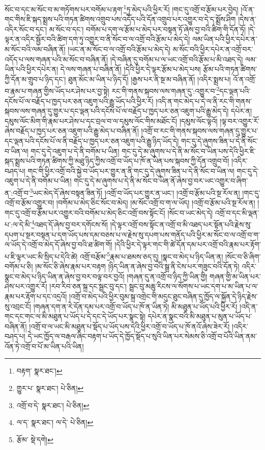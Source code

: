 སོང་བ་དང་མ་སོང་བ་མ་གཏོགས་པར་བགོམ་པ་རྟག་\footnote{བརྟག་  སྣར་ཐང་། }ཏུ་མེད་པའི་ཕྱིར་རོ། །གང་དུ་འགྲོ་བ་རྩོམ་པར་བྱེད། །འོ་ན་གང་གིས་ཇི་སྐད་སྨྲས་པའི་གཏན་ཚིགས་འགྲུབ་པས་འདོད་པའི་དོན་འགྲུབ་པར་འགྱུར་བ་དེ་ད་སྨྲོས་ཤིག །དེས་ན་འདིར་སོང་བ་དང་། མ་སོང་བ་དང་། བགོམ་པ་དག་ལ་རྩོམ་པ་མེད་པར་བསྟན་ཏོ་ཞེས་བྱ་བའི་ཚིག་གི་དོན་ཏོ། །དེ་ལྟར་ན་འདིར་སྦྱོར་བའི་ཚིག་དག་ཏུ་འགྱུར་བ་ནི་སོང་བ་ལ་འགྲོ་བའི་རྩོམ་པ་མེད་དེ། ལམ་ཡིན་པའི་ཕྱིར་དཔེར་ན་མ་སོང་བའི་ལམ་བཞིན་ནོ། །ཡང་ན་མ་སོང་བ་ལ་འགྲོ་བའི་རྩོམ་པ་མེད་དེ། མ་སོང་བའི་ཕྱིར་དཔེར་ན་འགྲོ་བར་འདོད་པ་ལས་གཞན་པའི་མ་སོང་བ་བཞིན་ནོ། །དེ་བཞིན་དུ་བགོམ་པ་ལ་ཡང་འགྲོ་བའི་རྩོམ་པ་མི་འཐད་དེ། ལམ་ཡིན་པའི་ཕྱིར་དཔེར་ན། དེ་ལས་གཞན་པ་བཞིན་ནོ། །དེའི་ཕྱིར་དེ་ལྟར་རྩོམ་པ་མེད་པས། རྩོམ་པའི་གཏན་ཚིགས་ཀྱི་དོན་མ་གྲུབ་པ་ཉིད་དང་། ཐུན་མོང་མ་ཡིན་པ་ཉིད་དོ། །རྒྱས་པར་ནི་སྔ་མ་བཞིན་ནོ། །འདིར་སྨྲས་པ། འོ་ན་འགྲོ་བ་རྣམ་པ་གཞན་གྱིས་ཡོད་པར་ཤེས་པར་བྱ་སྟེ། རང་གི་གནས་སྐབས་ལས་གཞན་དུ་:འགྱུར་བ་\footnote{གྱུར་པ་  སྣར་ཐང་།  པེ་ཅིན། }དང་ལྡན་པའི་དངོས་པོ་ལ་བརྗོད་པ་ཁྱད་པར་ཅན་འཇུག་པའི་རྒྱུ་ཡོད་པའི་ཕྱིར་རོ། །འདི་ན་གང་མེད་པ་དེ་ལ་ནི་རང་གི་གནས་སྐབས་ལས་གཞན་དུ་གྱུར་པ་དང་ལྡན་པའི་དངོས་པོ་ལ་བརྗོད་པ་ཁྱད་པར་ཅན་འཇུག་པའི་རྒྱུ་མེད་དེ། དཔེར་ན། དམུས་ལོང་མིག་གི་རྣམ་པར་ཤེས་པ་དང་བྲལ་བ་ལ་དམུས་ལོང་གིས་མཐོང་ངོ། །དམུས་ལོང་ལྟའོ། །ལྟ་བར་འགྱུར་རོ་ཞེས་བརྗོད་པ་ཁྱད་པར་ཅན་འཇུག་པའི་རྒྱུ་མེད་པ་བཞིན་ནོ། །འགྲོ་བ་རང་གི་གནས་སྐབས་ལས་གཞན་དུ་གྱུར་པ་དང་ལྡན་པའི་དངོས་པོ་ལ་ནི་བརྗོད་པ་ཁྱད་པར་ཅན་འཇུག་པའི་རྒྱུ་ཉིད་ཡོད་དེ། གང་དུ་དེ་ཞུགས་ཟིན་པ་དེ་ནི་སོང་བ་ཡིན་ལ། གང་དུ་དེ་འཇུག་པ་དེ་ནི་བགོམ་པ་ཡིན། གང་དུ་དེ་མ་ཞུགས་པ་དེ་ནི་མ་སོང་བ་ཡིན་པས་དེའི་ཕྱིར་ཇི་སྐད་སྨྲས་པའི་གཏན་ཚིགས་ཀྱི་མཐུ་ཉིད་ཀྱིས་འགྲོ་བ་ཡོད་པ་ཁོ་ན་ཡིན་པས་སྐབས་ཀྱི་དོན་འགྲུབ་བོ། །འདིར་བཤད་པ། གང་གི་ཕྱིར་འགྲོ་བའི་སྐྱེ་བ་ཡོད་པར་གྱུར་ན་ནི་གང་དུ་དེ་ཞུགས་ཟིན་པ་དེ་ནི་སོང་བ་ཡིན་ལ། གང་དུ་དེ་འཇུག་པ་དེ་ནི་བགོམ་པ་ཡིན། གང་དུ་དེ་མ་ཞུགས་པ་དེ་ནི་མ་སོང་བ་ཡིན་ནོ་ཞེས་བྱ་བར་ཡང་འགྱུར་བ་ཞིག་ན་:འགྲོ་བ་\footnote{འགྲོ་བ་དེ་  སྣར་ཐང་།  པེ་ཅིན། }ཡང་མེད་དོ་ཞེས་བསྟན་ཟིན་ཏོ། །འགྲོ་བ་ཡོད་པར་གྱུར་ན་ཡང་། །འགྲོ་བ་རྩོམ་པའི་སྔ་རོལ་ན། །གང་དུ་འགྲོ་བ་རྩོམ་འགྱུར་བ། །བགོམ་པ་མེད་ཅིང་སོང་བ་མེད། །མ་སོང་འགྲོ་བ་ག་ལ་ཡོད། །འགྲོ་བ་རྩོམ་པའི་སྔ་རོལ་ན། །གང་དུ་འགྲོ་བ་རྩོམ་པར་འགྱུར་བའི་བགོམ་པ་མེད་ཅིང་འགྲོ་བས་སྟོང་ངོ། །སོང་བ་ཡང་མེད་དེ། འགྲོ་བ་དང་མི་ལྡན་པ་:ལ་དེ་མི་\footnote{ལ་ད་  སྣར་ཐང་། ལ་དེ་  པེ་ཅིན། }འཐད་དོ་ཞེས་བྱ་བར་དགོངས་སོ། །དེ་ལྟར་འགྲོ་བས་སྟོང་ན་འགྲོ་བ་མི་འཐད་པར་སྟོན་པའི་རྗེས་སུ་དཔག་པ་སྔར་བསྟན་པ་དག་ཡོད་པས་དམ་བཅས་པ་ལ་རྗེས་སུ་དཔག་པས་གནོད་པའི་ཕྱིར་མ་སོང་བ་ལ་འགྲོ་བ་ག་ལ་ཡོད་དེ་འགྲོ་བ་མེད་དོ་ཞེས་བྱ་བའི་ཐ་ཚིག་གོ། །དེའི་ཕྱིར་དེ་ལྟར་གང་གི་ཚེ་དོན་དམ་པར་འགྲོ་བའི་རྣམ་པར་རྟོག་པ་ཇི་ལྟར་ཡང་མི་སྲིད་པ་དེའི་ཚེ། འགྲོ་བརྩོམ་\footnote{རྩོམ་  སྡེ་དགེ། }རྣམ་པ་ཐམས་ཅད་དུ། །སྣང་བ་མེད་པ་ཉིད་ཡིན་ན། །སོང་བ་ཅི་ཞིག་བགོམ་པ་ཅི། །མ་སོང་ཅི་ཞེས་རྣམ་པར་བརྟག །ཉིད་ཡིན་ན་ཞེས་བྱ་བའི་སྒྲ་ནི་ངེས་པར་གཟུང་བའི་དོན་ཏེ། འདིར་སྣང་བ་མེད་པ་ཉིད་ཡིན་ན་ཞེས་བྱ་བར་བལྟ་བར་བྱའོ། །གཞན་དུ་ན་འགྲོ་བ་ཉིད་ཀྱི་ཡིན་གྱི། གཞན་གྱི་མ་ཡིན་པར་ཤེས་པར་འགྱུར་རོ། །རབ་རིབ་ཅན་སྐྲ་དང་སྦྲང་བུ་དང་། སྦྲང་བུ་མཆུ་རིངས་ལ་སོགས་པ་ཡང་དག་པ་མ་ཡིན་པ་ལ་རྣམ་པར་རྟོག་པ་དང་འདྲའོ། །འགྲོ་བ་མེད་པའི་ཕྱིར་བུམ་སྐྲ་འགྲེང་གི་མདུང་ཐུང་བཞིན་དུ་ཁྱོད་ལ་སྐྱོན་དེ་ཉིད་རྗེས་སུ་འབྲང་ངོ། །གཞན་དག་ན་རེ་དོན་དམ་པར་འགྲོ་བ་ཡོད་པ་ཁོ་ན་ཡིན་ཏེ། མི་མཐུན་པ་ཡོད་པའི་ཕྱིར་རོ། །འདི་ན་གང་དང་གང་ལ་མི་མཐུན་པ་ཡོད་པ་དེ་དང་དེ་ཡོད་པར་སྣང་སྟེ། དཔེར་ན་སྣང་བའི་མི་མཐུན་པ་མུན་པ་ཡོད་པ་བཞིན་ནོ། །འགྲོ་བ་ལ་ཡང་མི་མཐུན་པ་སྡོད་པ་ཡོད་པས་དེའི་ཕྱིར་འགྲོ་བ་ཡོད་པ་ཁོ་ནའོ་ཞེས་ཟེར་རོ། །འདིར་བཤད་པ། དེ་ཡང་ཁྱོད་ལ་བརྒལ་ཞིང་བརྟག་པ་ཡོད་དེ་ཁྱོད་སྡོད་པ་སུའི་ཡིན་པར་སེམས་ཅི་འགྲོ་བ་པོའི་ཡིན་ནམ་འོན་ཏེ་འགྲོ་བ་པོ་མ་ཡིན་པའི་ཡིན། 